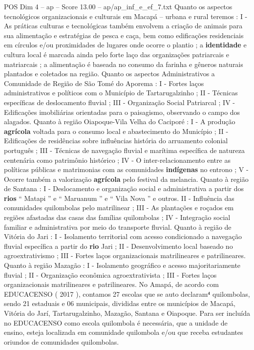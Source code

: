 \begin{textsample}{POS Dim 4 – ap – Score 13.00 – ap/ap\_inf\_e\_ef\_7.txt}
Quanto os aspectos tecnológicos organizacionais e culturais em Macapá – urbana e rural teremos : I - As práticas culturas e tecnológicas também envolvem a criação de animais para sua alimentação e estratégias de pesca e caça, bem como edificações residenciais em círculos e/ou proximidades de lugares onde ocorre o plantio ; a \textbf{identidade} e cultura local é marcada ainda pelo forte laço das organizações patriarcais e matriarcais ; a alimentação é baseada no consumo da farinha e gêneros naturais plantados e coletados na região.
Quanto os aspectos Administrativos a Comunidade de Região de São Tomé do Aporema : I - Fortes laços administrativos e políticos com o Município de Tartarugalzinho ; II - Técnicas específicas de deslocamento fluvial ; III - Organização Social Patriarcal ; IV - Edificações imobiliárias orientadas para o paisagismo, observando o campo dos alagados.
Quanto à região Oiapoque-Vila Velha do Caciporé : I - A produção \textbf{agrícola} voltada para o consumo local e abastecimento do Município ; II - Edificações de residências sobre influências história do arruamento colonial português ; III - Técnicas de navegação fluvial e marítima específica de natureza centenária como patrimônio histórico ; IV - O inter-relacionamento entre as políticas públicas e matrimonias com as comunidades \textbf{indígenas} no entrono ; V - Ocorre também a valorização \textbf{agrícola} pelo festival da melancia.
Quanto à região de Santana : I - Deslocamento e organização social e administrativa a partir dos \textbf{rios} “ Matapi ” e “ Maruanum ” e “ Vila Nova ” e outros.
II - Influência das comunidades quilombolas pelo matrilinear ; III - As plantações e roçados em regiões afastadas das casas das famílias quilombolas ; IV - Integração social familiar e administrativa por meio do transporte fluvial.
Quanto à região de Vitória do Jari : I - Isolamento territorial com acesso condicionado a navegação fluvial específica a partir do \textbf{rio} Jari ; II - Desenvolvimento local baseado no agroextrativismo ; III - Fortes laços organizacionais matrilineares e patrilineares.
Quanto à região Mazagão : I - Isolamento geográfico e acesso majoritariamente fluvial ; II - Organização econômica agroextrativista ; III - Fortes laços organizacionais matrilineares e patrilineares.
No Amapá, de acordo com EDUCACENSO ( 2017 ), contamos 27 escolas que se auto declaram⁴ quilombolas, sendo 21 estaduais e 06 municipais, divididas entre os municípios de Macapá, Vitória do Jarí, Tartarugalzinho, Mazagão, Santana e Oiapoque.
Para ser incluída no EDUCACENSO como escola quilombola é necessária, que a unidade de ensino, esteja localizada em comunidade quilombola e/ou que receba estudantes oriundos de comunidades quilombolas.

\end{textsample}
